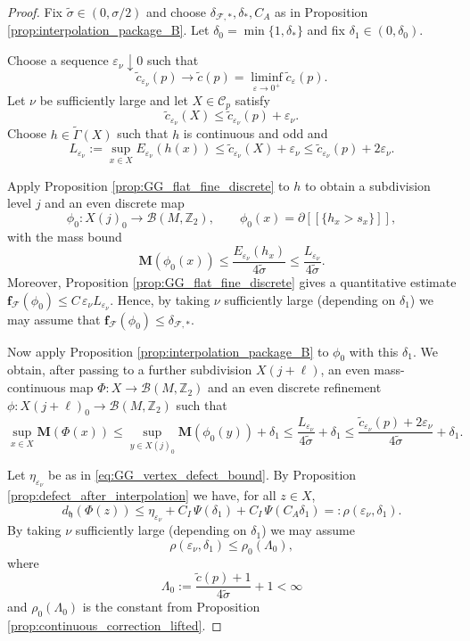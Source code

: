 \documentclass[12pt,english]{article}
\theoremstyle{definition}
\begin{document}
\begin{proof}
Fix $\tilde\sigma\in(0,\sigma/2)$ and choose $\delta_{\mathcal F,\ast},\delta_\ast,C_A$ as in
Proposition \ref{prop:interpolation_package_B}. Let $\delta_0 = \min\{1, \delta_*\}$ and fix $\delta_1\in(0,\delta_0)$.

Choose a sequence $\varepsilon_\nu\downarrow 0$ such that
\[
\tilde c_{\varepsilon_\nu}(p)\to \tilde c(p)=\liminf_{\varepsilon\to 0^+}\tilde c_\varepsilon(p).
\]
Let $\nu$ be sufficiently large and let $X\in\mathcal C_p$ satisfy
\[
\tilde c_{\varepsilon_\nu}(X)\le \tilde c_{\varepsilon_\nu}(p)+\varepsilon_\nu.
\]
Choose $h\in\tilde\Gamma(X)$ such that $h$ is continuous and odd and
\[
L_{\varepsilon_\nu}:=\sup_{x\in X}E_{\varepsilon_\nu}(h(x))
\le \tilde c_{\varepsilon_\nu}(X)+\varepsilon_\nu
\le \tilde c_{\varepsilon_\nu}(p)+2\varepsilon_\nu.
\]

Apply Proposition \ref{prop:GG_flat_fine_discrete} to $h$ to obtain a subdivision level $j$
and an even discrete map
\[
\phi_0:X(j)_0\to \mathcal B(M,\mathbb{Z}_2),\qquad \phi_0(x)=\partial[\![\{h_x>s_x\}]\!],
\]
with the mass bound
\[
\mathbf M(\phi_0(x))\le \frac{E_{\varepsilon_\nu}(h_x)}{4\tilde\sigma}\le \frac{L_{\varepsilon_\nu}}{4\tilde\sigma}.
\]
Moreover, Proposition \ref{prop:GG_flat_fine_discrete} gives a quantitative estimate $\mathbf f_{\mathcal F}(\phi_0)\le C\,\varepsilon_\nu L_{\varepsilon_\nu}$. Hence, by taking $\nu$ sufficiently large (depending on $\delta_1$) we may assume that $\mathbf f_{\mathcal F}(\phi_0)\le \delta_{\mathcal F,\ast}$.

Now apply Proposition \ref{prop:interpolation_package_B} to $\phi_0$ with this $\delta_1$.
We obtain, after passing to a further subdivision $X(j+\ell)$,
an even mass-continuous map $\Phi:X\to \mathcal B(M,\mathbb{Z}_2)$
and an even discrete refinement $\phi:X(j+\ell)_0\to \mathcal B(M,\mathbb{Z}_2)$ such that
\[
\sup_{x\in X}\mathbf M(\Phi(x))
\le \sup_{y\in X(j)_0}\mathbf M(\phi_0(y))+\delta_1
\le \frac{L_{\varepsilon_\nu}}{4\tilde\sigma}+\delta_1
\le \frac{\tilde c_{\varepsilon_\nu}(p)+2\varepsilon_\nu}{4\tilde\sigma}+\delta_1.
\]

Let $\eta_{\varepsilon_\nu}$ be as in \eqref{eq:GG_vertex_defect_bound}.
By Proposition \ref{prop:defect_after_interpolation} we have, for all $z\in X$,
\[
d_{\mathfrak h}(\Phi(z))
\le \eta_{\varepsilon_\nu} + C_I\,\Psi(\delta_1)+ C_I\,\Psi(C_A\delta_1)
=: \rho(\varepsilon_\nu,\delta_1).
\]
By taking $\nu$ sufficiently large (depending on $\delta_1$) we may assume
\[
\rho(\varepsilon_\nu,\delta_1)\le \rho_0(\Lambda_0),
\]
where
\[
\Lambda_0:=\frac{\tilde c(p)+1}{4\tilde\sigma}+1<\infty
\]
and $\rho_0(\Lambda_0)$ is the constant from Proposition
\ref{prop:continuous_correction_lifted}.


\end{proof}
\end{document}
